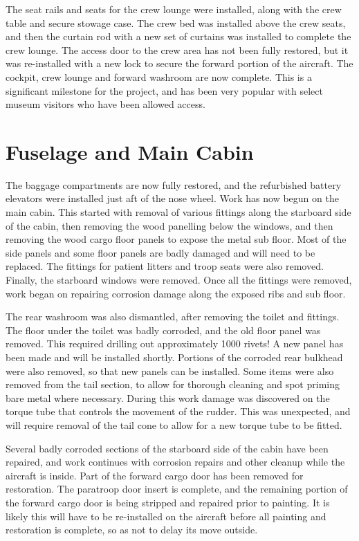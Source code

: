 The seat rails and seats for the crew lounge were installed, along
with the crew table and secure stowage case.  The crew bed was
installed above the crew seats, and then the curtain rod with a new
set of curtains was installed to complete the crew lounge.  The access
door to the crew area has not been fully restored, but it was
re-installed with a new lock to secure the forward portion of the
aircraft.  The cockpit, crew lounge and forward washroom are now
complete.  This is a significant milestone for the project, and has
been very popular with select museum visitors who have been allowed
access.

\section{Fuselage and Main Cabin}
\label{sec:main_cabin}

The baggage compartments are now fully restored, and the refurbished
battery elevators were installed just aft of the nose wheel.  Work has
now begun on the main cabin.  This started with removal of various
fittings along the starboard side of the cabin, then removing the wood
panelling below the windows, and then removing the wood cargo floor
panels to expose the metal sub floor.  Most of the side panels and
some floor panels are badly damaged and will need to be replaced.  The
fittings for patient litters and troop seats were also removed.
Finally, the starboard windows were removed.  Once all the fittings
were removed, work began on repairing corrosion damage along the
exposed ribs and sub floor.

The rear washroom was also dismantled, after removing the toilet and
fittings.  The floor under the toilet was badly corroded, and the old
floor panel was removed.  This required drilling out approximately
1000 rivets!  A new panel has been made and will be installed shortly.
Portions of the corroded rear bulkhead were also removed, so that new
panels can be installed.  Some items were also removed from the tail
section, to allow for thorough cleaning and spot priming bare metal
where necessary.  During this work damage was discovered on the torque
tube that controls the movement of the rudder.  This was unexpected,
and will require removal of the tail cone to allow for a new torque
tube to be fitted.

Several badly corroded sections of the starboard side of the cabin
have been repaired, and work continues with corrosion repairs and
other cleanup while the aircraft is inside.  Part of the forward cargo
door has been removed for restoration.  The paratroop door insert is
complete, and the remaining portion of the forward cargo door is being
stripped and repaired prior to painting.  It is likely this will have
to be re-installed on the aircraft before all painting and restoration
is complete, so as not to delay its move outside.


